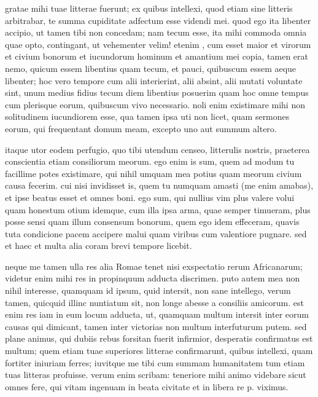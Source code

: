 


 gratae mihi tuae litterae fuerunt; ex quibus intellexi, quod etiam sine litteris arbitrabar, te summa cupiditate adfectum esse videndi mei. quod ego ita libenter accipio, ut tamen tibi non concedam; nam tecum esse, ita mihi commoda omnia quae opto, contingant, ut vehementer velim! etenim , cum esset maior et virorum et civium bonorum et iucundorum hominum et amantium mei copia, tamen erat nemo, quicum essem libentius quam tecum, et pauci, quibuscum essem aeque libenter; hoc vero tempore cum alii interierint, alii absint, alii mutati voluntate sint, unum medius fidius tecum diem libentius posuerim quam hoc omne tempus cum plerisque eorum, quibuscum vivo necessario. noli enim existimare mihi non solitudinem iucundiorem esse, qua tamen ipsa uti non licet, quam sermones eorum, qui frequentant domum meam, excepto uno aut summum altero.

 itaque utor eodem perfugio, quo tibi utendum censeo, litterulis nostris, praeterea conscientia etiam consiliorum meorum. ego enim is sum, quem ad modum tu facillime potes existimare, qui nihil umquam mea potius quam meorum civium causa fecerim. cui nisi invidisset is, quem tu numquam amasti (me enim amabas), et ipse beatus esset et omnes boni. ego sum, qui nullius vim plus valere volui quam honestum otium idemque, cum illa ipsa arma, quae semper timueram, plus posse sensi quam illum consensum bonorum, quem ego idem effeceram, quavis tuta condicione pacem accipere malui quam viribus cum valentiore pugnare. sed et haec et multa alia coram brevi tempore licebit.

 neque me tamen ulla res alia Romae tenet nisi exspectatio rerum Africanarum; videtur enim mihi res in propinquum adducta discrimen. puto autem mea non nihil interesse, quamquam id ipsum, quid intersit, non sane intellego, verum tamen, quicquid illinc nuntiatum sit, non longe abesse a consiliis amicorum. est enim res iam in eum locum adducta, ut, quamquam multum intersit inter eorum causas qui dimicant, tamen inter victorias non multum interfuturum putem. sed plane animus, qui dubiis rebus forsitan fuerit infirmior, desperatis confirmatus est multum; quem etiam tuae superiores litterae confirmarunt, quibus intellexi, quam fortiter iniuriam ferres; iuvitque me tibi cum summam humanitatem tum etiam tuas litteras profuisse. verum enim scribam: teneriore mihi animo videbare sicut omnes fere, qui vitam ingenuam in beata civitate et in libera re p. viximus.

